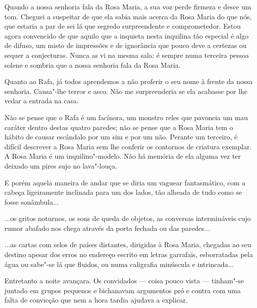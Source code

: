 Quando a nossa senhoria fala da Rosa Maria, a sua voz perde firmeza e
desce um tom. Cheguei a suspeitar de que ela sabia mais acerca da Rosa
Maria do que nós, que estaria a par de sei lá que segredo surpreendente
e comprometedor. Estou agora convencido de que aquilo que a inquieta
nesta inquilina tão especial é algo de difuso, um misto de impressões e
de ignorância que pouco deve a certezas ou sequer a conjecturas. Nunca
as vi na mesma sala: é sempre numa terceira pessoa solene e sombria que
a nossa senhoria fala da Rosa Maria.

Quanto ao Rafa, já todos aprendemos a não proferir o seu nome à frente
da nossa senhoria. Causa"-lhe terror e asco. Não me surpreenderia se ela
acabasse por lhe vedar a entrada na casa.

Não se pense que o Rafa é um facínora, um monstro reles que pavoneia um
mau caráter dentro destas quatro paredes;
não se pense que a Rosa Maria tem o hábito de causar escândalo por um
sim e por um não. Perante um terceiro, é difícil descrever a Rosa Maria
sem lhe conferir os contornos de criatura exemplar. A Rosa Maria é um
inquilino"-modelo. Não há memória de ela alguma vez ter deixado um pires
sujo no lava"-louça.

E porém aquela maneira de andar que se diria um vaguear fantasmático,
com a cabeça ligeiramente inclinada para um dos lados, tão alheada de
tudo como se fosse sonâmbula...

...os gritos noturnos, os sons de queda de objetos, as conversas
intermináveis cujo rumor abafado nos chega através da porta fechada ou
das paredes...

...as cartas com selos de países distantes, dirigidas à Rosa Maria,
chegadas ao seu destino apesar dos erros no endereço escrito em letras
garrafais, esborratadas pela água ou sabe"-se lá que fluidos, ou numa
caligrafia minúscula e intrincada...

Entretanto a noite avançara. Os convidados --- coisa pouco vista ---
tinham"-se juntado em grupos pequenos e bichanavam argumentos pró e
contra com uma falta de convicção que nem a hora tardia ajudava a
explicar.

